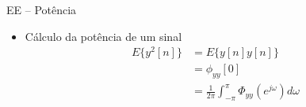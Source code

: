 \documentclass[
size=17pt,
paper=smartboard,
mode=present,
display=slidesnotes,
style=sailor,
nopagebreaks,
blackslide,
fleqn]{powerdot}
\begin{document}
%      

\begin{slide}[toc=]{EE -- Potência}
\begin{itemize}
   \item C\'alculo da pot\^encia de um sinal
   \begin{align*}
      E\{y^2[n]\} &= E\{y[n]y[n]\}\\
                  &= \phi_{yy}[0]\\
                  &= \frac{1}{2\pi}\int_{-\pi}^{\pi}\Phi_{yy}(e^{j\omega})d\omega 
   \end{align*}
\end{itemize}
\end{slide}
\end{document}
